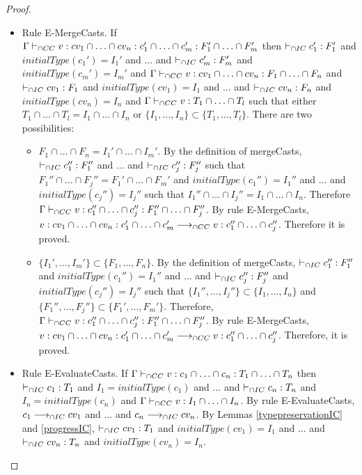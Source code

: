 \documentclass[a4paper]{article}
\begin{document}
\begin{proof}
\begin{itemize}
    \item Rule E-MergeCasts.
    If $\Gamma \vdash_{\cap CC} v : cv_1 \cap \ldots \cap cv_n : c_1' \cap \ldots \cap c_m' : F_1' \cap \ldots \cap F_m'$ then $\vdash_{\cap IC} c_1' : F_1'$ and $initialType(c_1') = I_1'$ and ... and $\vdash_{\cap IC} c_m' : F_m'$ and $initialType(c_m') = I_m'$ and $\Gamma \vdash_{\cap CC} v : cv_1 \cap \ldots \cap cv_n : F_1 \cap \ldots \cap F_n$ and $\vdash_{\cap IC} cv_1 : F_1$ and $initialType(cv_1) = I_1$ and ... and $\vdash_{\cap IC} cv_n : F_n$ and $initialType(cv_n) = I_n$ and $\Gamma \vdash_{\cap CC} v : T_1 \cap \ldots \cap T_l$ such that either $T_1 \cap \ldots \cap T_l = I_1 \cap \ldots \cap I_n$ or $\{I_1, \ldots, I_n\} \subset \{T_1, \ldots, T_l\}$.
    There are two possibilities:
    \begin{itemize}
        \item $F_1 \cap \ldots \cap F_n = I_1' \cap \ldots \cap I_m'$.
        By the definition of mergeCasts, $\vdash_{\cap IC} c_1'' : F_1''$ and ... and $\vdash_{\cap IC} c_j'' : F_j''$ such that $F_1'' \cap \ldots \cap F_j'' = F_1' \cap \ldots \cap F_m'$ and $initialType(c_1'') = I_1''$ and ... and $initialType(c_j'') = I_j''$ such that $I_1'' \cap \ldots \cap I_j'' = I_1 \cap \ldots \cap I_n$.
        Therefore $\Gamma \vdash_{\cap CC} v : c_1'' \cap \ldots \cap c_j'' : F_1'' \cap \ldots \cap F_j''$.
        By rule E-MergeCasts, $v : cv_1 \cap \ldots \cap cv_n : c_1' \cap \ldots \cap c_m' \longrightarrow_{\cap CC} v : c_1'' \cap \ldots \cap c_j''$.
        Therefore it is proved.
        \item $\{I_1', \ldots, I_m'\} \subset \{F_1, \ldots, F_n\}$.
        By the definition of mergeCasts, $\vdash_{\cap IC} c_1'' : F_1''$ and $initialType(c_1'') = I_1''$ and ... and $\vdash_{\cap IC} c_j'' : F_j''$ and $initialType(c_j'') = I_j''$ such that $\{I_1'', \ldots, I_j''\} \subset \{I_1, \ldots, I_n\}$ and $\{F_1'', \ldots, F_j''\} \subset \{F_1', \ldots, F_m'\}$.
        Therefore, $\Gamma \vdash_{\cap CC} v : c_1'' \cap \ldots \cap c_j'' : F_1'' \cap \ldots \cap F_j''$.
        By rule E-MergeCasts, $v : cv_1 \cap \ldots \cap cv_n : c_1' \cap \ldots \cap c_m' \longrightarrow_{\cap CC} v : c_1'' \cap \ldots \cap c_j''$.
        Therefore, it is proved.
    \end{itemize}
    \item Rule E-EvaluateCasts.
    If $\Gamma \vdash_{\cap CC} v : c_1 \cap \ldots \cap c_n : T_1 \cap \ldots \cap T_n$ then $\vdash_{\cap IC} c_1 : T_1$ and $I_1 = initialType(c_1)$ and ... and $\vdash_{\cap IC} c_n : T_n$ and $I_n = initialType(c_n)$ and $\Gamma \vdash_{\cap CC} v : I_1 \cap \ldots \cap I_n$.
    By rule E-EvaluateCasts, $c_1 \longrightarrow_{\cap IC} cv_1$ and ... and $c_n \longrightarrow_{\cap IC} cv_n$.
    By Lemmas \ref{typepreservationIC} and \ref{progressIC}, $\vdash_{\cap IC} cv_1 : T_1$ and $initialType(cv_1) = I_1$ and ... and $\vdash_{\cap IC} cv_n : T_n$ and $initialType(cv_n) = I_n$.

\end{itemize}
\end{proof}
\end{document}
